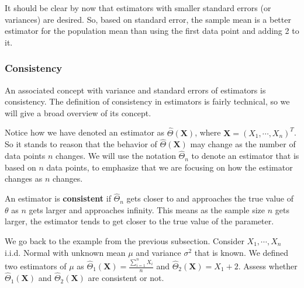 \documentclass[
]{book}
\begin{document}
It should be clear by now that estimators with smaller standard errors (or variances) are desired. So, based on standard error, the sample mean is a better estimator for the population mean than using the first data point and adding 2 to it.

\subsubsection{Consistency}\label{consistency}

An associated concept with variance and standard errors of estimators is consistency. The definition of consistency in estimators is fairly technical, so we will give a broad overview of its concept.

Notice how we have denoted an estimator as \(\hat{\Theta}(\boldsymbol{X})\), where \(\boldsymbol{X} = (X_1, \cdots, X_n)^T\). So it stands to reason that the behavior of \(\hat{\Theta}(\boldsymbol{X})\) may change as the number of data points \(n\) changes. We will use the notation \(\hat{\Theta}_n\) to denote an estimator that is based on \(n\) data points, to emphasize that we are focusing on how the estimator changes as \(n\) changes.

An estimator is \textbf{consistent} if \(\hat{\Theta}_n\) gets closer to and approaches the true value of \(\theta\) as \(n\) gets larger and approaches infinity. This means as the sample size \(n\) gets larger, the estimator tends to get closer to the true value of the parameter.

We go back to the example from the previous subsection. Consider \(X_1, \cdots, X_n\) i.i.d. Normal with unknown mean \(\mu\) and variance \(\sigma^2\) that is known. We defined two estimators of \(\mu\) as \(\hat{\Theta}_1(\boldsymbol{X}) = \frac{\sum_{i=1}^n X_i}{n}\) and \(\hat{\Theta}_2(\boldsymbol{X}) = X_1 + 2\). Assess whether \(\hat{\Theta}_1(\boldsymbol{X})\) and \(\hat{\Theta}_2(\boldsymbol{X})\) are consistent or not.
\end{document}
